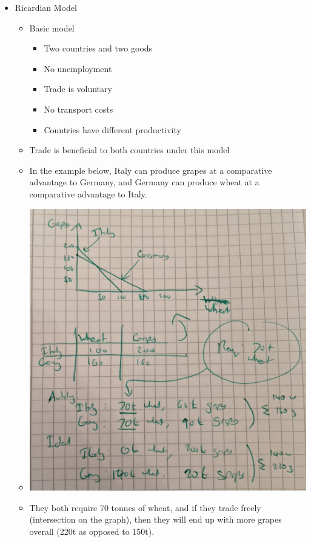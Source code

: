 \documentclass[11pt]{article}
\begin{document}
\begin{itemize}
\begin{itemize}
\begin{itemize}
\end{itemize}
\item Ricardian Model
\begin{itemize}
\item Basic model
\begin{itemize}
\item Two countries and two goods
\item No unemployment
\item Trade is voluntary
\item No transport costs
\item Countries have different productivity
\end{itemize}
\item Trade is beneficial to both countries under this model
\item In the example below, Italy can produce grapes at a comparative advantage
to Germany, and Germany can produce wheat at a comparative advantage to
Italy.
\item \begin{center}
\includegraphics[width=.9\linewidth]{img/screenshots/Conflict_And_Cooperation_Beyond_The_Nation_State/2020-07-18_21-41-32_screenshot.png}
\end{center}
\item They both require 70 tonnes of wheat, and if they trade freely
(intersection on the graph), then they
will end up with more grapes overall (220t as opposed to 150t).

\end{itemize}
\end{itemize}
\end{itemize}
\end{document}
